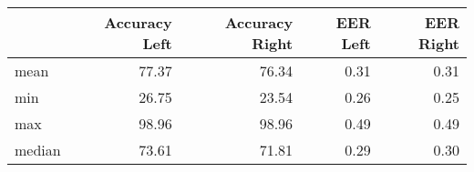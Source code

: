 \begin{tabular}{lrrrr}
\toprule
{} &  Accuracy Left &  Accuracy Right &  EER Left &  EER Right \\
\midrule
mean   &          77.37 &           76.34 &      0.31 &       0.31 \\
min    &          26.75 &           23.54 &      0.26 &       0.25 \\
max    &          98.96 &           98.96 &      0.49 &       0.49 \\
median &          73.61 &           71.81 &      0.29 &       0.30 \\
\bottomrule
\end{tabular}
